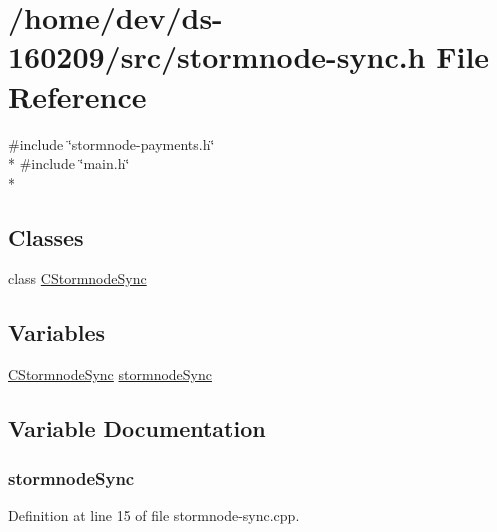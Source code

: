 \hypertarget{stormnode-sync_8h}{}\section{/home/dev/ds-\/160209/src/stormnode-\/sync.h File Reference}
\label{stormnode-sync_8h}
{\ttfamily \#include \char`\"{}stormnode-\/payments.\+h\char`\"{}}\\*
{\ttfamily \#include \char`\"{}main.\+h\char`\"{}}\\*
\subsection*{Classes}
\begin{DoxyCompactItemize}
\item 
class \hyperlink{class_c_stormnode_sync}{C\+Stormnode\+Sync}
\end{DoxyCompactItemize}
\subsection*{Variables}
\begin{DoxyCompactItemize}
\item 
\hyperlink{class_c_stormnode_sync}{C\+Stormnode\+Sync} \hyperlink{stormnode-sync_8h_a4233fda53cfb60fd6ba208d981ac3fe7}{stormnode\+Sync}
\end{DoxyCompactItemize}


\subsection{Variable Documentation}
\hypertarget{stormnode-sync_8h_a4233fda53cfb60fd6ba208d981ac3fe7}{}
\subsubsection[{stormnode\+Sync}]{ stormnode\+Sync}\label{stormnode-sync_8h_a4233fda53cfb60fd6ba208d981ac3fe7}


Definition at line 15 of file stormnode-\/sync.\+cpp.

